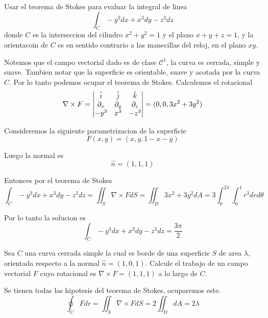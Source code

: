 \message{ !name(MAT024.tex)}\documentclass[../main.tex]{subfiles}
\begin{document}
\begin{problem}
  Usar el teorema de Stokes para evaluar la integral de linea
  \begin{equation*}
    \int_{C} -y^{3} dx + x^{3} dy - z^{3} dz
  \end{equation*}
  donde $C$ es la interseccion del cilindro $x^{2} + y^{2} = 1$ y el plano $x + y + z = 1$, y la
  orientacoin de $C$ es en sentido contrario a las manecillas del reloj, en el plano $xy$.
\end{problem}
\begin{solution}
  Notemos que el campo vectorial dado es de clase $\mathcal{C}^{1}$, la curva es cerrada, simple y suave. Tambien notar que la superficie es orientable, suave y acotada por la curva $C$. Por lo tanto podemos ocupar el teorema de Stokes. Calculemos el rotacional
  \begin{equation*}
    \nabla \times F = \begin{vmatrix} \hat{i} & \hat{j} & \hat{k}\\ \partial_x & \partial_y & \partial_z\\ -y^{3} & x^{3} & -z^{3}\end{vmatrix} = (0, 0, 3x^{2} + 3y^{2})
  \end{equation*}

  Consideremos la siguiente parametrizacion de la superficie
  \begin{equation*}
    F(x, y) = (x, y, 1 - x - y)
  \end{equation*}

  Luego la normal es
  \begin{equation*}
    \hat{n} = (1, 1, 1)
  \end{equation*}

  Entonces por el teorema de Stokes
  \begin{equation*}
    \int_{C} -y^{3} dx + x^{3}dy - z^{3} dz = \iint_{S} \nabla \times F dS = \iint_{D} 3x^{2} + 3y^{2} dA = 3\int_{0}^{2\pi}\int_{0}^{1}r^{3} dr d\theta
  \end{equation*}

  Por lo tanto la solucion es
  \begin{equation*}
    \int_{C} -y^{3} dx + x^{3}dy - z^{3} dz = \frac{3\pi}{2}
  \end{equation*}
\end{solution}

\begin{problem}
  Sea $C$ una curva cerrada simple la cual es borde de una superficie $S$ de area $\lambda$, orientada respecto a la normal $\hat{n} = (1, 0, 1)$. Calcule el trabajo de un campo vectorial
  $F$ cuyo rotacional es $\nabla \times F = (1, 1, 1)$ a lo largo de $C$.
\end{problem}
\begin{solution}
  Se tienen todas las hipotesis del teorema de Stokes, ocuparemos este.
  \begin{equation*}
    \oint_{C} F dr = \iint_{S} \nabla \times F dS = 2 \iint_{D} dA = 2 \lambda
  \end{equation*}
\end{solution}
\end{document}
